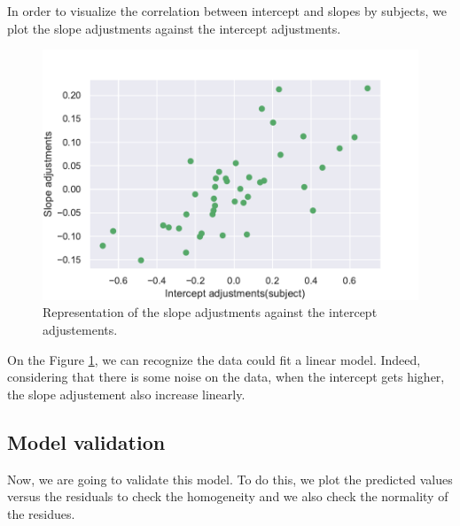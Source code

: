 \documentclass{article}
\begin{document}
In order to visualize the correlation between intercept and slopes by subjects, we plot the slope adjustments against the intercept adjustments.
\begin{figure}[H]
    \centering
    \includegraphics[scale=.65]{./images/adj_so_inter.pdf}
    \caption{Representation of the slope adjustments against the intercept adjustements.}
    \label{fig:adj_slope}
\end{figure}

On the Figure \ref{fig:adj_slope}, we can recognize the data could fit a linear model. Indeed, considering that there is some noise on the data, when the intercept gets higher, the slope adjustement also increase linearly. 

\subsection{Model validation}
Now, we are going to validate this model. To do this, we plot the predicted values versus the residuals to check the homogeneity and we also check the normality of the residues.
\end{document}
